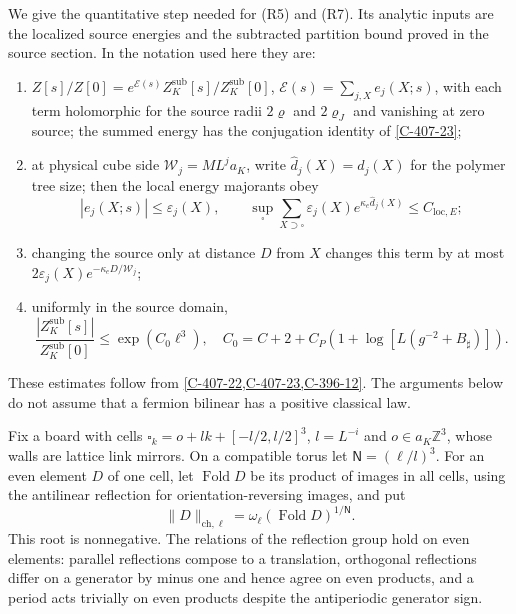 \documentclass[11pt,letterpaper,reqno]{amsart}
\theoremstyle{definition}
\theoremstyle{remark}
\begin{document}
We give the quantitative step needed for (R5) and (R7).
Its analytic inputs are the localized source energies
and the subtracted partition bound proved in the
source section.  In the notation used here they are:
\begin{enumerate}
\item $Z[s]/Z[0]=e^{\mathcal E(s)}
 Z_K^{\mathrm{sub}}[s]/Z_K^{\mathrm{sub}}[0]$,
$\mathcal E(s)=\sum_{j,X}e_j(X;s)$, with each
term holomorphic for the source radii $2\varrho$
and $2\varrho_J$ and vanishing at zero source; the summed energy
has the conjugation identity of \cref{C-407-23};
\item at physical cube side $\mathscr W_j=ML^ja_K$,
write $\hat d_j(X)=d_j(X)$ for the polymer tree size;
then the local energy majorants obey
\[
 |e_j(X;s)|\le\varepsilon_j(X),\qquad
 \sup_\square\sum_{X\supset\square}
       \varepsilon_j(X)e^{\kappa_e\hat d_j(X)}
                                      \le C_{\mathrm{loc},E};
\]
\item changing the source only at distance $D$
from $X$ changes this term by at most
$2\varepsilon_j(X)e^{-\kappa_eD/\mathscr W_j}$;
\item uniformly in the source domain,
\[
 \frac{|Z_K^{\mathrm{sub}}[s]|}{Z_K^{\mathrm{sub}}[0]}
 \le\exp(C_0\ell^3),\quad
 C_0=C+2+C_P(1+\log[L(g^{-2}+B_\sharp)]).
\]
\end{enumerate}
These estimates follow from \cref{C-407-22,C-407-23,C-396-12}.  The arguments below do
not assume that a fermion bilinear has a positive
classical law.

Fix a board with cells
$\square_k=o+lk+[-l/2,l/2]^3$, $l=L^{-i}$ and
$o\in a_K\mathbb Z^3$, whose walls are lattice
link mirrors.  On a compatible torus let
$\mathsf N=(\ell/l)^3$.  For an even element $D$
of one cell, let $\operatorname{Fold}D$ be its
product of images in all cells, using the
antilinear reflection for orientation-reversing
images, and put
\[
 \|D\|_{\mathrm{ch},\ell}
       =\omega_\ell(\operatorname{Fold}D)^{1/\mathsf N}.
\]
This root is nonnegative.  The relations of the
reflection group hold on even elements: parallel
reflections compose to a translation, orthogonal
reflections differ on a generator by minus one
and hence agree on even products, and a period
acts trivially on even products despite the
antiperiodic generator sign.
\end{document}
